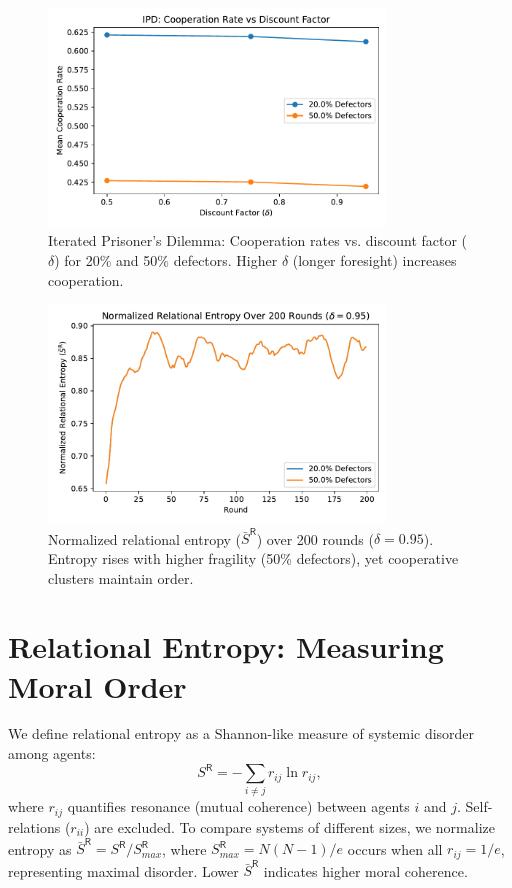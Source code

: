 \documentclass[11pt,a4paper]{article}
\begin{document}
\begin{figure}[h]
  \centering
  \includegraphics[width=0.8\textwidth]{ipd_chart.pdf}
  \caption{Iterated Prisoner’s Dilemma: Cooperation rates vs. discount factor ($\delta$) for 20\% and 50\% defectors. Higher $\delta$ (longer foresight) increases cooperation.}
  \label{fig:ipd}
\end{figure}

\begin{figure}[h]
  \centering
  \includegraphics[width=0.8\textwidth]{entropy_chart.pdf}
  \caption{Normalized relational entropy ($\bar{S}^{\mathsf{R}}$) over 200 rounds ($\delta = 0.95$). Entropy rises with higher fragility (50\% defectors), yet cooperative clusters maintain order.}
  \label{fig:sr_over_time}
\end{figure}

\section{Relational Entropy: Measuring Moral Order}
We define relational entropy as a Shannon-like measure of systemic disorder among agents:
\begin{equation}
S^{\mathsf{R}} = -\sum_{i \ne j} r_{ij} \ln r_{ij},
\end{equation}
where $r_{ij}$ quantifies resonance (mutual coherence) between agents $i$ and $j$. Self-relations ($r_{ii}$) are excluded. To compare systems of different sizes, we normalize entropy as $\bar{S}^{\mathsf{R}} = S^{\mathsf{R}} / S^{\mathsf{R}}_{max}$, where $S^{\mathsf{R}}_{max} = N(N-1)/e$ occurs when all $r_{ij} = 1/e$, representing maximal disorder. Lower $\bar{S}^{\mathsf{R}}$ indicates higher moral coherence.
\end{document}
